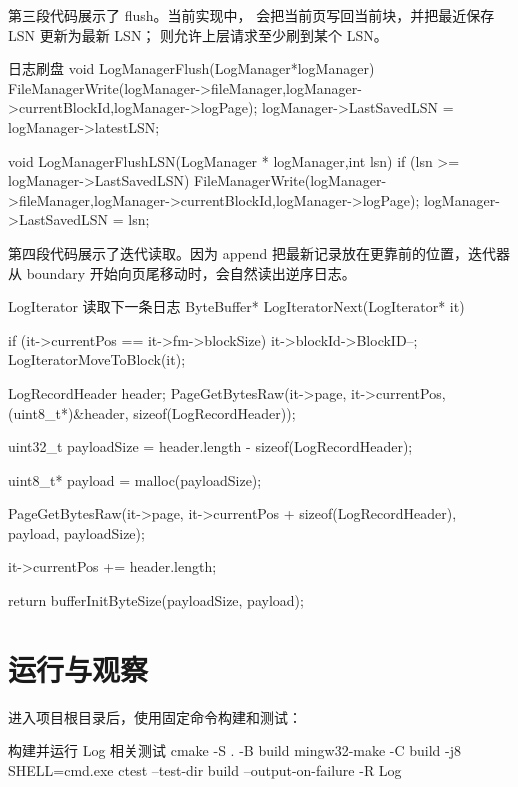 第三段代码展示了 flush。当前实现中， 会把当前页写回当前块，并把最近保存 LSN 更新为最新 LSN； 则允许上层请求至少刷到某个 LSN。

\begin{dbcode}{日志刷盘}
void LogManagerFlush(LogManager*logManager){
    FileManagerWrite(logManager->fileManager,logManager->currentBlockId,logManager->logPage);
    logManager->LastSavedLSN = logManager->latestLSN;
}

void LogManagerFlushLSN(LogManager * logManager,int lsn){
    if (lsn >= logManager->LastSavedLSN) {
        FileManagerWrite(logManager->fileManager,logManager->currentBlockId,logManager->logPage);
        logManager->LastSavedLSN = lsn;
    }
}
\end{dbcode}

第四段代码展示了迭代读取。因为 append 把最新记录放在更靠前的位置，迭代器从 boundary 开始向页尾移动时，会自然读出逆序日志。

\begin{dbcode}{LogIterator 读取下一条日志}
ByteBuffer* LogIteratorNext(LogIterator* it) {
    if (it->currentPos == it->fm->blockSize) {
        it->blockId->BlockID--;
        LogIteratorMoveToBlock(it);
    }

    LogRecordHeader header;
    PageGetBytesRaw(it->page,
                    it->currentPos,
                    (uint8_t*)&header,
                    sizeof(LogRecordHeader));

    uint32_t payloadSize =
        header.length - sizeof(LogRecordHeader);

    uint8_t* payload = malloc(payloadSize);

    PageGetBytesRaw(it->page,
        it->currentPos + sizeof(LogRecordHeader),
        payload,
        payloadSize);

    it->currentPos += header.length;

    return bufferInitByteSize(payloadSize, payload);
}
\end{dbcode}

\section{运行与观察}
\label{sec:log-run}

进入项目根目录后，使用固定命令构建和测试：

\begin{dbcode}[listing options={language=bash}]{构建并运行 Log 相关测试}
cmake -S . -B build
mingw32-make -C build -j8 SHELL=cmd.exe
ctest --test-dir build --output-on-failure -R Log
\end{dbcode}

